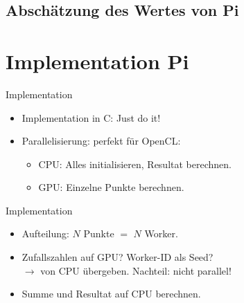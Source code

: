 \documentclass{beamer}
\begin{document}
\subsection{Abschätzung des Wertes von Pi}

\section{Implementation Pi}
\begin{frame}{Implementation}
	\begin{itemize}
		\item Implementation in C: Just do it!
		\item Parallelisierung: perfekt für OpenCL:
			\begin{itemize}
				\item<3-> CPU: Alles initialisieren, Resultat berechnen.
				\item<3-> GPU: Einzelne Punkte berechnen.
			\end{itemize}
	\end{itemize}
\end{frame}
\begin{frame}{Implementation}
	\begin{itemize}
		\item Aufteilung: $N$ Punkte $=$ $N$ Worker.
		\item Zufallszahlen auf GPU? Worker-ID als Seed? \\
		$\rightarrow$ von CPU übergeben. Nachteil: nicht parallel!
		\item Summe und Resultat auf CPU berechnen.
	\end{itemize}
\end{frame}
\end{document}
